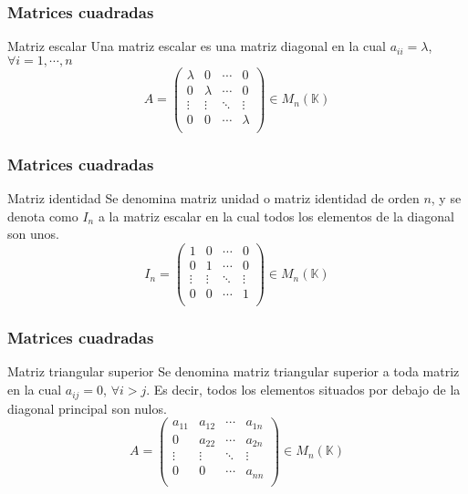\documentclass[aspectratio=169]{beamer}
\begin{document}
 
   \begin{frame}
  \frametitle{Matrices cuadradas}
   \begin{block}{Matriz escalar}
Una matriz escalar es una matriz diagonal en la cual $a_{ii} = \lambda$,  $\forall i = 1, \cdots, n $
\[ A =  \left(\begin{matrix} %
      \lambda & 0 & \cdots & 0 \\
      0 & \lambda & \cdots & 0 \\
  \vdots & \vdots & \ddots & \vdots \\
   0 & 0 & \cdots & \lambda \\
    \end{matrix}\right) \in M_{ n} (\mathbb{K})\]
  \end{block}
 \end{frame}
 
 



 \begin{frame}
  \frametitle{Matrices cuadradas}
   \begin{block}{Matriz identidad}
Se denomina matriz unidad o matriz identidad de orden $n$, y se denota como $I_n$ a la matriz escalar en la cual todos los elementos de la diagonal son unos. 
\[ I_n =  \left(\begin{matrix} %
      1 & 0 & \cdots & 0 \\
      0 & 1 & \cdots & 0 \\
  \vdots & \vdots & \ddots & \vdots \\
   0 & 0 & \cdots & 1 \\
    \end{matrix}\right) \in M_{ n} (\mathbb{K})\]
  \end{block}
 \end{frame}
 
 
 
  \begin{frame}
  \frametitle{Matrices cuadradas}
   \begin{block}{Matriz triangular superior}
Se denomina matriz triangular superior a toda matriz en la cual $a_{ij} = 0$,  $\forall i > j $. Es decir, todos los elementos situados por debajo de la diagonal principal son nulos. 
\[ A =  \left(\begin{matrix} %
      a_{11} & a_{12} & \cdots & a_{1n} \\
      0 & a_{22} & \cdots & a_{2n} \\
  \vdots & \vdots & \ddots & \vdots \\
   0 & 0 & \cdots & a_{nn} \\
    \end{matrix}\right) \in M_{ n} (\mathbb{K})\]
  \end{block}
 \end{frame}
\end{document}
